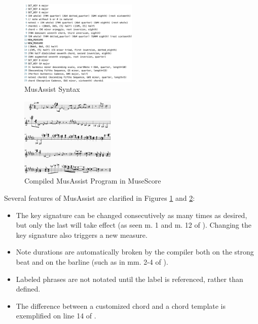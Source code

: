 \documentclass{article}
\begin{document}
\begin{figure}[h!]
\centering
\includegraphics[width=0.5\textwidth]{images/example_program_code}
\caption{MusAssist Syntax}\label{fig:example_program_code}
\end{figure}
\begin{figure}[h!]
\centering
\includegraphics[width=0.4\textwidth]{images/example_program}
\caption{Compiled MusAssist Program in MuseScore}\label{fig:example_program}
\end{figure}

Several features of MusAssist are clarified in Figures \ref{fig:example_program_code} and \ref{fig:example_program}:
\begin{itemize}\itemsep0pt
\item The key signature can be changed consecutively as many times as desired, but only the last will take effect (as seen m. 1 and m. 12 of ). Changing the key signature also triggers a new measure.
\item Note durations are automatically broken by the compiler both on the strong beat and on the barline (such as in mm. 2-4 of ).
\item Labeled phrases are not notated until the label is referenced, rather than defined.
\item The difference between a customized chord and a chord template is exemplified on line 14 of .
\end{itemize}

\end{document}
